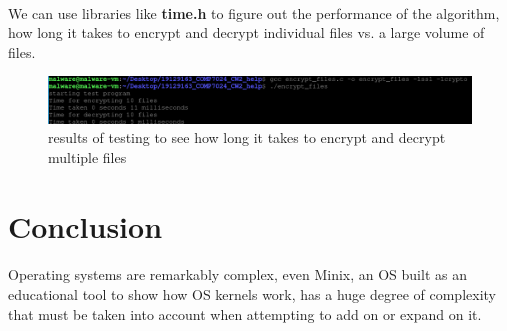 \documentclass{article}
\begin{document}
    \paragraph{}We can use libraries like \textbf{time.h} to figure out the performance of the algorithm, how long it takes to encrypt and decrypt individual files vs. a large volume of files.
    \begin{figure}[htbp]
        \centering\includegraphics[width=\textwidth]{encrypt_test.png}
        \caption{results of testing to see how long it takes to encrypt and decrypt multiple files}
        \label{fig:my_label}
    \end{figure}

\section{Conclusion}
    \paragraph{}Operating systems are remarkably complex, even Minix, an OS built as an educational tool to show how OS kernels work, has a huge degree of complexity that must be taken into account when attempting to add on or expand on it.

\printbibliography
\end{document}
